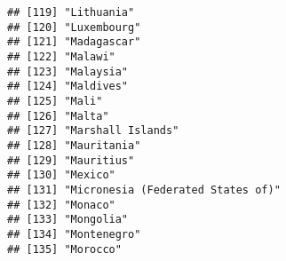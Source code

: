 \documentclass[
]{article}
\begin{document}
\begin{verbatim}
## [119] "Lithuania"                                                                                                                                            
## [120] "Luxembourg"                                                                                                                                           
## [121] "Madagascar"                                                                                                                                           
## [122] "Malawi"                                                                                                                                               
## [123] "Malaysia"                                                                                                                                             
## [124] "Maldives"                                                                                                                                             
## [125] "Mali"                                                                                                                                                 
## [126] "Malta"                                                                                                                                                
## [127] "Marshall Islands"                                                                                                                                     
## [128] "Mauritania"                                                                                                                                           
## [129] "Mauritius"                                                                                                                                            
## [130] "Mexico"                                                                                                                                               
## [131] "Micronesia (Federated States of)"                                                                                                                     
## [132] "Monaco"                                                                                                                                               
## [133] "Mongolia"                                                                                                                                             
## [134] "Montenegro"                                                                                                                                           
## [135] "Morocco"                                                                                                                                              

\end{verbatim}
\end{document}
